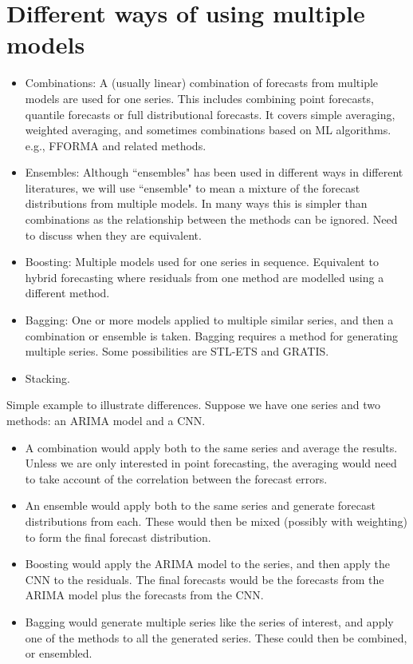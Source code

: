 \documentclass[11pt]{article}
\begin{document}
\section{Different ways of using multiple models}
\begin{itemize}
\item Combinations: A (usually linear) combination of forecasts from multiple models are used for one series. This includes combining point forecasts, quantile forecasts or full distributional forecasts. It covers simple averaging, weighted averaging, and sometimes combinations based on ML algorithms. e.g., FFORMA and related methods.
\item Ensembles: Although ``ensembles" has been used in different ways in different literatures, we will use ``ensemble" to mean a mixture of the forecast distributions from multiple models. In many ways this is simpler than combinations as the relationship between the methods can be ignored. Need to discuss when they are equivalent.
\item Boosting: Multiple models used for one series in sequence. Equivalent to hybrid forecasting where residuals from one method are modelled using a different method.
\item Bagging: One or more models applied to multiple similar series, and then a combination or ensemble is taken. Bagging requires a method for generating multiple series. Some possibilities are STL-ETS and GRATIS.
\item Stacking.
\end{itemize}

Simple example to illustrate differences. Suppose we have one series and two methods: an ARIMA model and a CNN.

\begin{itemize}
\item A combination would apply both to the same series and average the results. Unless we are only interested in point forecasting, the averaging would need to take account of the correlation between the forecast errors.
\item An ensemble would apply both to the same series and generate forecast distributions from each. These would then be mixed (possibly with weighting) to form the final forecast distribution.
\item Boosting would apply the ARIMA model to the series, and then apply the CNN to the residuals. The final forecasts would be the forecasts from the ARIMA model plus the forecasts from the CNN.
\item Bagging would generate multiple series like the series of interest, and apply one of the methods to all the generated series. These could then be combined, or ensembled.
\end{itemize}
\end{document}
